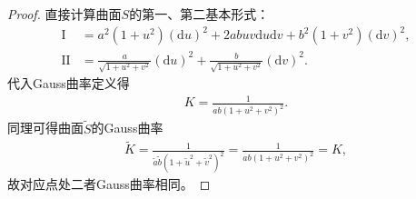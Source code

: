 \documentclass[../../main.tex]{subfiles}%
\begin{document}
\begin{proof}

直接计算曲面$S$的第一、第二基本形式：
\begin{align*}
\mathrm{I} &= a^2(1+u^2)(\mathrm{d}u)^2+2abuv\mathrm{d}u\mathrm{d}v+b^2(1+v^2)(\mathrm{d}v)^2,\\
\mathrm{II} &= \frac{a}{\sqrt{1+u^2+v^2}}(\mathrm{d}u)^2+\frac{b}{\sqrt{1+u^2+v^2}}(\mathrm{d}v)^2.
\end{align*}
代入Gauss曲率定义得
\begin{align}
K = \frac{1}{ab(1+u^2+v^2)^2}. \label{eq:ex_curv_S}
\end{align}
同理可得曲面$\tilde{S}$的Gauss曲率
\begin{align*}
\tilde{K} = \frac{1}{\tilde{a}\tilde{b}(1+\tilde{u}^2+\tilde{v}^2)^2} = \frac{1}{ab(1+u^2+v^2)^2}=K,
\end{align*}
故对应点处二者Gauss曲率相同。


\end{proof}
\end{document}
